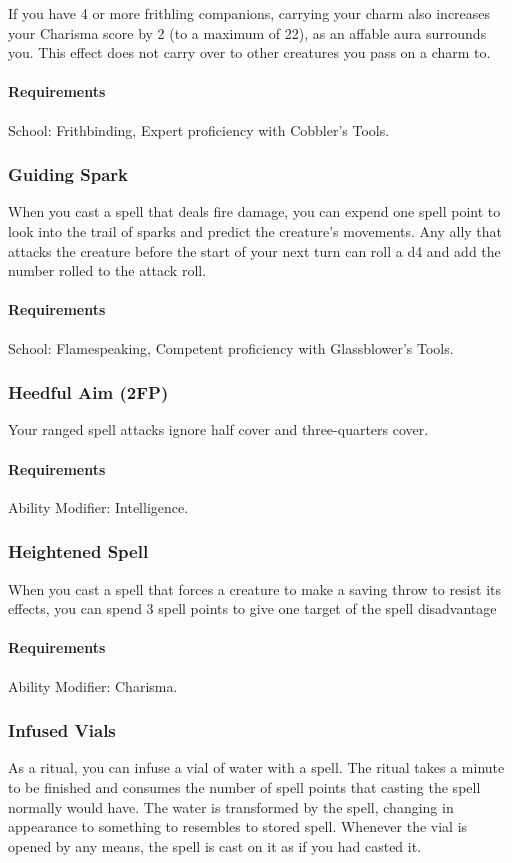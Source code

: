     If you have 4 or more frithling companions, carrying your charm also increases your Charisma score by 2 (to a maximum of 22), as an affable aura surrounds you.
    This effect does not carry over to other creatures you pass on a charm to.
    \paragraph{Requirements} School: Frithbinding, Expert proficiency with Cobbler's Tools.
\subsubsection{Guiding Spark} \label{feat::guidingspark}
    When you cast a spell that deals fire damage, you can expend one spell point to look into the trail of sparks and predict the creature's movements.
    Any ally that attacks the creature before the start of your next turn can roll a d4 and add the number rolled to the attack roll.
    \paragraph{Requirements} School: Flamespeaking, Competent proficiency with Glassblower's Tools.
\subsubsection{Heedful Aim (2FP)} \label{feat::heedfulaim}
    Your ranged spell attacks ignore half cover and three-quarters cover.
    \paragraph{Requirements} Ability Modifier: Intelligence.
\subsubsection{Heightened Spell} \label{feat::heightenedspell}
    When you cast a spell that forces a creature to make a saving throw to resist its effects, you can spend 3 spell points to give one target of the spell disadvantage
    \paragraph{Requirements} Ability Modifier: Charisma.
\subsubsection{Infused Vials} \label{feat::infusedvials}
    As a ritual, you can infuse a vial of water with a spell.
    The ritual takes a minute to be finished and consumes the number of spell points that casting the spell normally would have.
    The water is transformed by the spell, changing in appearance to something to resembles to stored spell.
    Whenever the vial is opened by any means, the spell is cast on it as if you had casted it.

